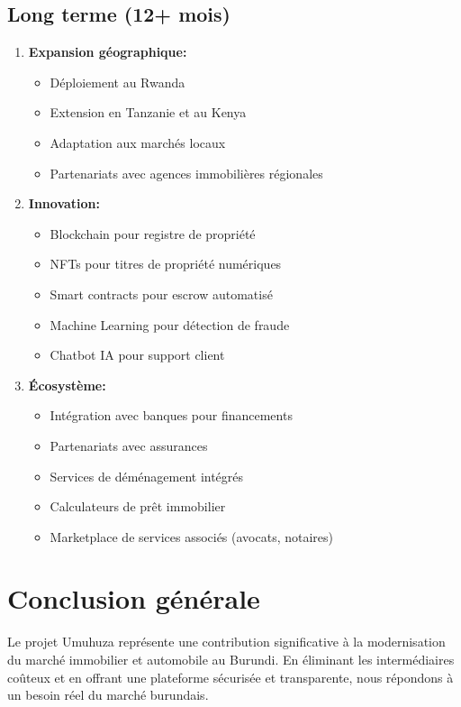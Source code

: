 \subsection{Long terme (12+ mois)}

\begin{enumerate}
    \item \textbf{Expansion géographique:}
    \begin{itemize}
        \item Déploiement au Rwanda
        \item Extension en Tanzanie et au Kenya
        \item Adaptation aux marchés locaux
        \item Partenariats avec agences immobilières régionales
    \end{itemize}

    \item \textbf{Innovation:}
    \begin{itemize}
        \item Blockchain pour registre de propriété
        \item NFTs pour titres de propriété numériques
        \item Smart contracts pour escrow automatisé
        \item Machine Learning pour détection de fraude
        \item Chatbot IA pour support client
    \end{itemize}

    \item \textbf{Écosystème:}
    \begin{itemize}
        \item Intégration avec banques pour financements
        \item Partenariats avec assurances
        \item Services de déménagement intégrés
        \item Calculateurs de prêt immobilier
        \item Marketplace de services associés (avocats, notaires)
    \end{itemize}
\end{enumerate}

\section{Conclusion générale}

Le projet Umuhuza représente une contribution significative à la modernisation du marché immobilier et automobile au Burundi. En éliminant les intermédiaires coûteux et en offrant une plateforme sécurisée et transparente, nous répondons à un besoin réel du marché burundais.

